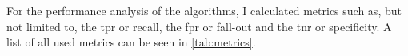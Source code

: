 For the performance analysis of the algorithms, I calculated metrics such as, but not limited to, the \gls{tpr} or recall,
the \gls{fpr} or fall-out and the \gls{tnr} or specificity. A list of all used metrics can be seen in \autoref{tab:metrics}.

\begin{table}
    \centering
    \caption{The metrics used for this works analysis as well as their calculation. Right: Confusion
    matrix for a binary (positive/negative) classification.}
    \label{tab:metrics}
    \begin{subtable}{0.48\textwidth}
        \centering
    \end{subtable}%
    \begin{subtable}{0.48\textwidth}
        \centering
    \end{subtable}%
\end{table}